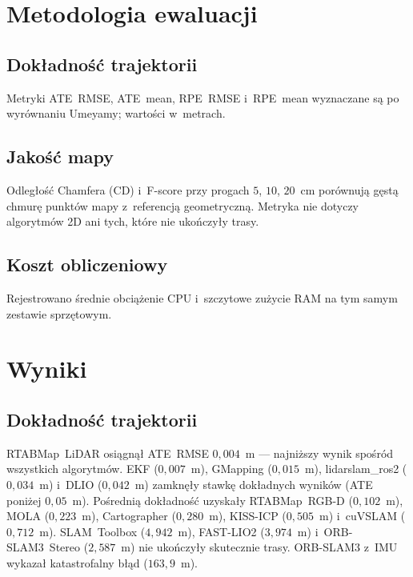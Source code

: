 \section{Metodologia ewaluacji}

\subsection{Dokładność trajektorii}

Metryki ATE~RMSE, ATE~mean, RPE~RMSE i~RPE~mean wyznaczane są po wyrównaniu
Umeyamy; wartości w~metrach.

\subsection{Jakość mapy}

Odległość Chamfera (CD) i~F-score przy progach $5$, $10$, $20$~cm porównują
gęstą chmurę punktów mapy z~referencją geometryczną.
Metryka nie dotyczy algorytmów 2D ani tych, które nie ukończyły trasy.

\subsection{Koszt obliczeniowy}

Rejestrowano średnie obciążenie CPU i~szczytowe zużycie RAM na tym samym
zestawie sprzętowym.

\section{Wyniki}



\subsection{Dokładność trajektorii}



RTABMap~LiDAR osiągnął ATE~RMSE $0{,}004$~m --- najniższy wynik spośród
wszystkich algorytmów.
EKF ($0{,}007$~m), GMapping ($0{,}015$~m), lidarslam\_ros2 ($0{,}034$~m)
i~DLIO ($0{,}042$~m) zamknęły stawkę dokładnych wyników (ATE poniżej $0{,}05$~m).
Pośrednią dokładność uzyskały RTABMap~RGB-D ($0{,}102$~m), MOLA ($0{,}223$~m),
Cartographer ($0{,}280$~m), KISS-ICP ($0{,}505$~m) i~cuVSLAM ($0{,}712$~m).
SLAM~Toolbox ($4{,}942$~m), FAST-LIO2 ($3{,}974$~m) i~ORB-SLAM3~Stereo
($2{,}587$~m) nie ukończyły skutecznie trasy.
ORB-SLAM3 z~IMU wykazał katastrofalny błąd ($163{,}9$~m).

